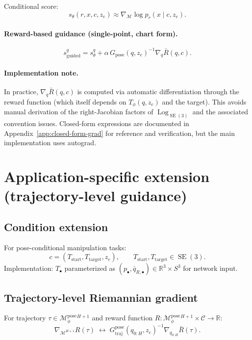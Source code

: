 \documentclass[11pt,a4paper]{article}
\DeclareMathOperator{\Log}{Log}
\DeclareMathOperator{\SE}{SE}
\newcommand{\R}{\mathbb{R}}
\newcommand{\Mset}{\mathcal{M}}
\newcommand{\Mpose}{\mathcal{M}_\phi^{\text{pose}}}
\newcommand{\Tphi}{T_\phi}
\begin{document}
Conditional score:
\begin{equation}
s_\theta(r, x, c, z_e) \approx \nabla_{\Mset} \log p_r(x \mid c, z_e).
\end{equation}

\paragraph{Reward-based guidance (single-point, chart form).}
\begin{equation}
s_{\text{guided}}^q = s_\theta^q + \alpha \, G_{\text{pose}}(q, z_e)^{-1} \nabla_q \bar R(q, c).
\end{equation}

\paragraph{Implementation note.} In practice, $\nabla_q \bar R(q, c)$ is computed via automatic differentiation through the reward function (which itself depends on $\Tphi(q, z_e)$ and the target). This avoids manual derivation of the right-Jacobian factors of $\Log_{\SE(3)}$ and the associated convention issues. Closed-form expressions are documented in Appendix~\ref{app:closed-form-grad} for reference and verification, but the main implementation uses autograd.

\section{Application-specific extension (trajectory-level guidance)}

\subsection{Condition extension}

For pose-conditional manipulation tasks:
\begin{equation}
c = (T_{\text{start}}, T_{\text{target}}, z_e), \qquad T_{\text{start}}, T_{\text{target}} \in \SE(3).
\end{equation}
Implementation: $T_\bullet$ parameterized as $(p_\bullet, \bar q_{R, \bullet}) \in \R^3 \times S^3$ for network input.

\subsection{Trajectory-level Riemannian gradient}

For trajectory $\tau \in \Mpose^{H+1}$ and reward function $R: \Mpose^{H+1} \times \mathcal{C} \to \R$:
\begin{equation}
\nabla_{\Mset^{H+1}} R(\tau) \;\leftrightarrow\; G_{\text{traj}}^{\text{pose}}(q_{0:H}, z_e)^{-1} \nabla_{q_{0:H}} \bar R(\tau).
\end{equation}
\end{document}
